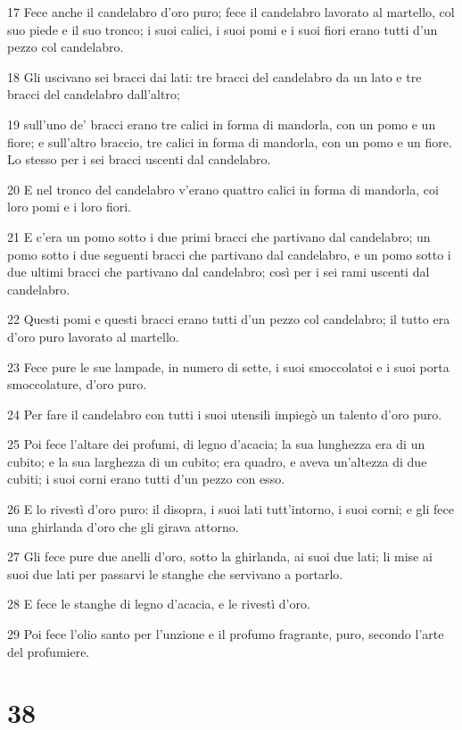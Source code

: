 \par 17 Fece anche il candelabro d'oro puro; fece il candelabro lavorato al martello, col suo piede e il suo tronco; i suoi calici, i suoi pomi e i suoi fiori erano tutti d'un pezzo col candelabro.
\par 18 Gli uscivano sei bracci dai lati: tre bracci del candelabro da un lato e tre bracci del candelabro dall'altro;
\par 19 sull'uno de' bracci erano tre calici in forma di mandorla, con un pomo e un fiore; e sull'altro braccio, tre calici in forma di mandorla, con un pomo e un fiore. Lo stesso per i sei bracci uscenti dal candelabro.
\par 20 E nel tronco del candelabro v'erano quattro calici in forma di mandorla, coi loro pomi e i loro fiori.
\par 21 E c'era un pomo sotto i due primi bracci che partivano dal candelabro; un pomo sotto i due seguenti bracci che partivano dal candelabro, e un pomo sotto i due ultimi bracci che partivano dal candelabro; così per i sei rami uscenti dal candelabro.
\par 22 Questi pomi e questi bracci erano tutti d'un pezzo col candelabro; il tutto era d'oro puro lavorato al martello.
\par 23 Fece pure le sue lampade, in numero di sette, i suoi smoccolatoi e i suoi porta smoccolature, d'oro puro.
\par 24 Per fare il candelabro con tutti i suoi utensili impiegò un talento d'oro puro.
\par 25 Poi fece l'altare dei profumi, di legno d'acacia; la sua lunghezza era di un cubito; e la sua larghezza di un cubito; era quadro, e aveva un'altezza di due cubiti; i suoi corni erano tutti d'un pezzo con esso.
\par 26 E lo rivestì d'oro puro: il disopra, i suoi lati tutt'intorno, i suoi corni; e gli fece una ghirlanda d'oro che gli girava attorno.
\par 27 Gli fece pure due anelli d'oro, sotto la ghirlanda, ai suoi due lati; li mise ai suoi due lati per passarvi le stanghe che servivano a portarlo.
\par 28 E fece le stanghe di legno d'acacia, e le rivestì d'oro.
\par 29 Poi fece l'olio santo per l'unzione e il profumo fragrante, puro, secondo l'arte del profumiere.

\chapter{38}

